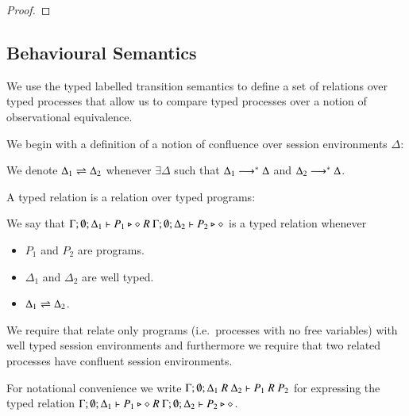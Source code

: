 \begin{proof}
\end{proof}

\subsection{Behavioural Semantics}

We use the typed labelled transition semantics to define
a set of relations over typed processes that allow us to compare
typed processes over a notion of observational equivalence.


We begin with a definition of a notion of confluence
over session environments $\Delta$:
\begin{definition}\rm
	We denote $\Delta_1 \rightleftharpoons \Delta_2$ whenever $\exists \Delta$ such that
	$\Delta_1 \longrightarrow^* \Delta$ and $\Delta_2 \longrightarrow^* \Delta$.
\end{definition}


A typed relation is a relation over typed programs:

\begin{definition}\rm
	We say that
	$\Gamma; \emptyset; \Delta_1 \vdash P_1 \triangleright \diamond\ R\ \Gamma; \emptyset; \Delta_2 \vdash P_2 \triangleright \diamond$
	is a typed relation whenever
	\begin{itemize}
		\item	$P_1$ and $P_2$ are programs.
		\item	$\Delta_1$ and $\Delta_2$ are well typed.
		\item	$\Delta_1 \rightleftharpoons \Delta_2$.
	\end{itemize}
\end{definition}

We require that relate only programs (i.e.\ processes with no free variables) with
well typed session environments and furthermore we require that two related processes
have confluent session environments.

For notational convenience we write
$\horel{\Gamma}{\Delta_1}{P_1}{\ R\ }{\Delta_2}{P_2}$
for expressing the typed relation $\Gamma; \emptyset; \Delta_1 \vdash P_1 \triangleright \diamond\ R\ \Gamma; \emptyset; \Delta_2 \vdash P_2 \triangleright \diamond$.

